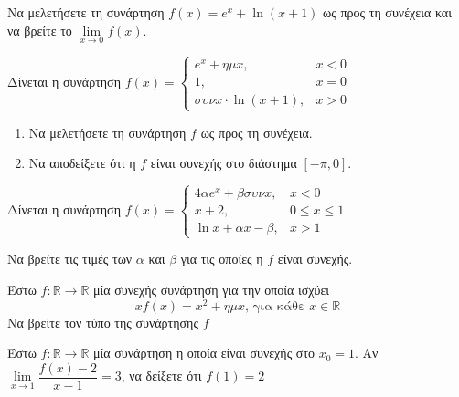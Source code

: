 \documentclass{presentation}
\begin{document}
\begin{askisi}
  Να μελετήσετε τη συνάρτηση $f(x)=e^x+\ln (x+1)$ ως προς τη συνέχεια και να βρείτε το $\lim\limits_{x \to 0}{ f(x) }$.


\end{askisi}

\begin{askisi}
  Δίνεται η συνάρτηση $f(x)=\begin{cases}
      e^x+ημx,             & x<0 \\
      1,                   & x=0 \\
      συνx\cdot \ln (x+1), & x>0
    \end{cases}$
  \begin{enumerate}[<+->]
    \item Να μελετήσετε τη συνάρτηση $f$ ως προς τη συνέχεια.
    \item Να αποδείξετε ότι η $f$ είναι συνεχής στο διάστημα $[-π,0]$.
  \end{enumerate}

\end{askisi}


\begin{askisi}
  Δίνεται η συνάρτηση $f(x)=\begin{cases}
      4αe^x+βσυνx, & x<0         \\
      x+2,         & 0\le x\le 1 \\
      \ln x+αx-β,  & x>1
    \end{cases}$

  Να βρείτε τις τιμές των $α$ και $β$ για τις οποίες η $f$ είναι συνεχής.

\end{askisi}

\begin{askisi}
  Έστω $f:\mathbb{R}\to\mathbb{R}$ μία συνεχής συνάρτηση για την οποία ισχύει
  $$xf(x)=x^2+ημx \text{, για κάθε } x\in\mathbb{R}$$
  Να βρείτε τον τύπο της συνάρτησης $f$

\end{askisi}

\begin{askisi}
  Έστω $f:\mathbb{R}\to\mathbb{R}$ μία συνάρτηση η οποία είναι συνεχής στο $x_0=1$. Αν $\lim\limits_{x \to 1}{ \dfrac{f(x)-2}{x-1} }=3$, να δείξετε ότι $f(1)=2$

\end{askisi}
\end{document}
